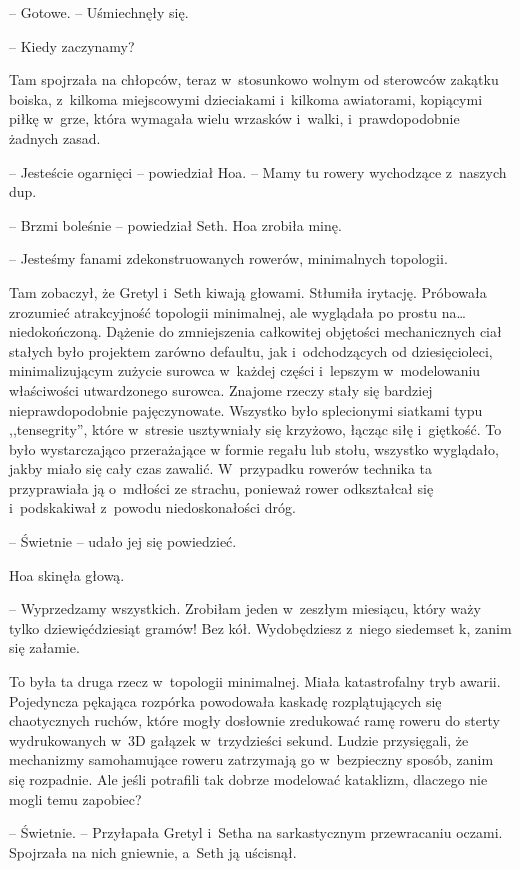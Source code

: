 \documentclass[oneside,polish,11pt,sfheadings]{mwbk}
\begin{document}
-- Gotowe. -- Uśmiechnęły się.

-- Kiedy zaczynamy? 

Tam spojrzała na chłopców, teraz w~stosunkowo
wolnym od sterowców zakątku boiska, z~kilkoma miejscowymi dzieciakami i~kilkoma awiatorami, kopiącymi piłkę w~grze, która wymagała wielu
wrzasków i~walki, i~prawdopodobnie żadnych zasad.

-- Jesteście ogarnięci -- powiedział Hoa. -- Mamy tu rowery wychodzące z~naszych dup.

-- Brzmi boleśnie -- powiedział Seth. Hoa zrobiła minę.

-- Jesteśmy fanami zdekonstruowanych rowerów, minimalnych topologii.

Tam zobaczył, że Gretyl i~Seth kiwają głowami. Stłumiła irytację.
Próbowała zrozumieć atrakcyjność topologii minimalnej, ale wyglądała po
prostu na\ldots  niedokończoną. Dążenie do zmniejszenia całkowitej objętości
mechanicznych ciał stałych było projektem zarówno defaultu, jak i~odchodzących od dziesięcioleci, minimalizującym zużycie surowca w~każdej
części i~lepszym w~modelowaniu właściwości utwardzonego surowca. Znajome
rzeczy stały się bardziej nieprawdopodobnie pajęczynowate. Wszystko było
splecionymi siatkami typu ,,tensegrity'', które w~stresie usztywniały
się krzyżowo, łącząc siłę i~giętkość. To było wystarczająco przerażające
w formie regału lub stołu, wszystko wyglądało, jakby miało się cały czas
zawalić. W~przypadku rowerów technika ta przyprawiała ją o~mdłości ze
strachu, ponieważ rower odkształcał się i~podskakiwał z~powodu
niedoskonałości dróg.

-- Świetnie -- udało jej się powiedzieć.

Hoa skinęła głową. 

-- Wyprzedzamy wszystkich. Zrobiłam jeden w~zeszłym
miesiącu, który waży tylko dziewięćdziesiąt gramów! Bez kół.
Wydobędziesz z~niego siedemset k, zanim się załamie.

To była ta druga rzecz w~topologii minimalnej. Miała katastrofalny tryb
awarii. Pojedyncza pękająca rozpórka powodowała kaskadę rozplątujących
się chaotycznych ruchów, które mogły dosłownie zredukować ramę roweru do
sterty wydrukowanych w~3D gałązek w~trzydzieści sekund. Ludzie
przysięgali, że mechanizmy samohamujące roweru zatrzymają go w~bezpieczny sposób, zanim się rozpadnie. Ale jeśli potrafili tak dobrze
modelować kataklizm, dlaczego nie mogli temu zapobiec?

-- Świetnie. -- Przyłapała Gretyl i~Setha na sarkastycznym przewracaniu
oczami. Spojrzała na nich gniewnie, a~Seth ją uścisnął.
\end{document}
